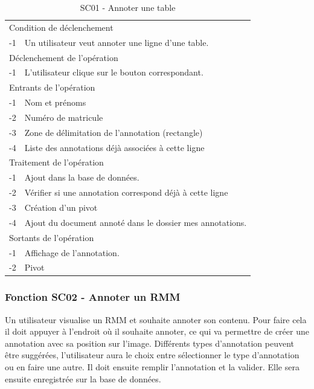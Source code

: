 \documentclass[a4paper]{article}
\begin{document}
\begin{table}[H]
  \centering
   \small
	\begin{tabular}{|c|p{12cm}|}
   		\hline
   			\rowcolor{lightgray}\multicolumn{2}{|c|}{\textbf{SC01 - Annoter une table}} \\
   		\hline
   			\multicolumn{2}{|l|}{Condition de d\'eclenchement} \\
   		\hline
   		-1 & Un utilisateur veut annoter une ligne d'une table. \\
   		\hline
   			\multicolumn{2}{|l|}{D\'eclenchement de l'op\'eration} \\
   		\hline
   			-1 & L'utilisateur clique sur le bouton correspondant. \\
   		\hline
   			\multicolumn{2}{|l|}{Entrants de l'op\'eration} \\
   		\hline
   			-1 & Nom et pr\'enoms \\
        	-2 & Num\'ero de matricule \\ 
        	-3 & Zone de d\'elimitation de l'annotation (rectangle) \\
            -4 & Liste des annotations d\'ej\`a associ\'ees \`a cette ligne \\
   		\hline
   			\multicolumn{2}{|l|}{Traitement de l'op\'eration} \\
  		\hline
   			-1 & Ajout dans la base de donn\'ees. \\
        	-2 & V\'erifier si une annotation correspond d\'ej\`a \`a cette ligne \\
        	-3 & Cr\'eation d'un pivot \\
            -4 & Ajout du document annot\'e dans le dossier mes annotations. \\
   		\hline
   			\multicolumn{2}{|l|}{Sortants de l'op\'eration} \\
   		\hline
   			-1 & Affichage de l'annotation. \\
            -2 & Pivot \\
   		\hline
	\end{tabular}
  \caption{SC01 - Annoter une table}
  \normalsize
  \label{tab:annoter_table}
\end{table}

\subsubsection{Fonction SC02 - Annoter un RMM}

Un utilisateur visualise un RMM et souhaite annoter son contenu. Pour faire cela il doit appuyer à l’endroit où il souhaite annoter, ce qui va permettre de créer une annotation avec sa position sur l’image. Différents types d’annotation peuvent être suggérées, l’utilisateur aura le choix entre sélectionner le type d’annotation ou en faire une autre. Il doit ensuite remplir l’annotation et la valider. Elle sera ensuite enregistrée sur la base de données.\\
\end{document}
